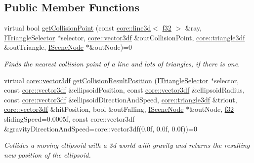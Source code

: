 \subsection*{Public Member Functions}
\begin{DoxyCompactItemize}
\item 
virtual bool \hyperlink{classirr_1_1scene_1_1ISceneCollisionManager_a0adcf9dca228fac89b085144141f33b0}{get\+Collision\+Point} (const \hyperlink{classirr_1_1core_1_1line3d}{core\+::line3d}$<$ \hyperlink{namespaceirr_a0277be98d67dc26ff93b1a6a1d086b07}{f32} $>$ \&ray, \hyperlink{classirr_1_1scene_1_1ITriangleSelector}{I\+Triangle\+Selector} $\ast$selector, \hyperlink{namespaceirr_1_1core_a06f169d08b5c429f5575acb7edbad811}{core\+::vector3df} \&out\+Collision\+Point, \hyperlink{namespaceirr_1_1core_a1112835405bbec5dadf031dc7934e7d0}{core\+::triangle3df} \&out\+Triangle, \hyperlink{classirr_1_1scene_1_1ISceneNode}{I\+Scene\+Node} $\ast$\&out\+Node)=0
\begin{DoxyCompactList}\small\item\em Finds the nearest collision point of a line and lots of triangles, if there is one. \end{DoxyCompactList}\item 
virtual \hyperlink{namespaceirr_1_1core_a06f169d08b5c429f5575acb7edbad811}{core\+::vector3df} \hyperlink{classirr_1_1scene_1_1ISceneCollisionManager_a4a1b1bdf49ec8dd3d4de8b502409ee00}{get\+Collision\+Result\+Position} (\hyperlink{classirr_1_1scene_1_1ITriangleSelector}{I\+Triangle\+Selector} $\ast$selector, const \hyperlink{namespaceirr_1_1core_a06f169d08b5c429f5575acb7edbad811}{core\+::vector3df} \&ellipsoid\+Position, const \hyperlink{namespaceirr_1_1core_a06f169d08b5c429f5575acb7edbad811}{core\+::vector3df} \&ellipsoid\+Radius, const \hyperlink{namespaceirr_1_1core_a06f169d08b5c429f5575acb7edbad811}{core\+::vector3df} \&ellipsoid\+Direction\+And\+Speed, \hyperlink{namespaceirr_1_1core_a1112835405bbec5dadf031dc7934e7d0}{core\+::triangle3df} \&triout, \hyperlink{namespaceirr_1_1core_a06f169d08b5c429f5575acb7edbad811}{core\+::vector3df} \&hit\+Position, bool \&out\+Falling, \hyperlink{classirr_1_1scene_1_1ISceneNode}{I\+Scene\+Node} $\ast$\&out\+Node, \hyperlink{namespaceirr_a0277be98d67dc26ff93b1a6a1d086b07}{f32} sliding\+Speed=0.\+0005f, const core\+::vector3df \&gravity\+Direction\+And\+Speed=core\+::vector3df(0.\+0f, 0.\+0f, 0.\+0f))=0
\begin{DoxyCompactList}\small\item\em Collides a moving ellipsoid with a 3d world with gravity and returns the resulting new position of the ellipsoid. \end{DoxyCompactList}\item 

\end{DoxyCompactItemize}

